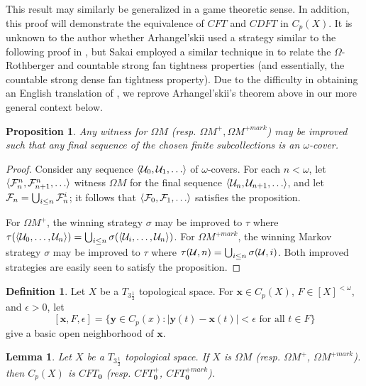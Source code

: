 \documentclass{amsart}
\renewcommand{\vec}{\mathbf}
\theoremstyle{plain}
\newtheorem{lemma}[theorem]{Lemma}
\newtheorem{proposition}[theorem]{Proposition}
\theoremstyle{definition}
\newtheorem{definition}[theorem]{Definition}
\theoremstyle{remark}
\theoremstyle{plain}
\theoremstyle{definition}
\theoremstyle{remark}
\begin{document}
This result may similarly be generalized in a game theoretic sense.
In addition, this proof will demonstrate the equivalence of
\(CFT\) and \(CDFT\) in \(C_p(X)\).
It is unknown to the author whether Arhangel'skii
used a strategy similar to the following proof in \cite{MR837289},
but Sakai employed a similar technique
in \cite{MR964873} to relate the \(\Omega\)-Rothberger and
countable strong fan tightness properties
(and essentially, the countable strong dense fan tightness property).
Due to the difficulty in obtaining an English translation of
\cite{MR837289}, we reprove Arhangel'skii's theorem above in our
more general context below.

\begin{proposition}
  Any witness for \(\Omega M\) (resp.
  \(\Omega M^+,\Omega M^{+mark}\))
  may be improved such that any final sequence of the chosen
  finite subcollections is an \(\omega\)-cover.
\end{proposition}

\begin{proof}
  Consider any sequence \(\<\mc U_0,\mc U_1,\dots\>\) of \(\omega\)-covers.
  For each \(n<\omega\), let
  \(\<\mc F_n^n,\mc F_{n+1}^n,\dots\>\) witness \(\Omega M\) for the final
  sequence \(\<\mc U_n,\mc U_{n+1},\dots\>\),
  and let \(\mathcal{F}_n=\bigcup_{i\leq n}\mathcal{F}_n^i\); it follows that
  \(\<\mc F_0,\mc F_1,\dots\>\) satisfies the proposition.

  For \(\Omega M^+\), the winning strategy \(\sigma\) may be improved to
  \(\tau\) where
  \(
    \tau(\langle\mathcal{U}_0,\dots,\mathcal{U}_n\rangle)
      =
    \bigcup_{i\leq n}\sigma(\langle\mathcal{U}_i,\dots,\mathcal{U}_n\rangle)
  \). For \(\Omega M^{+mark}\), the winning Markov strategy \(\sigma\) may
  be improved to \(\tau\) where
  \(
    \tau(\mathcal{U},n)
      =
    \bigcup_{i\leq n}\sigma(\mathcal{U},i)
  \). Both improved strategies are easily seen to satisfy the proposition.
\end{proof}

\begin{definition}
  Let \(X\) be a \(T_{3\frac{1}{2}}\) topological space.
  For \(\vec x\in C_p(X)\), \(F\in[X]^{<\omega}\), and
  \(\epsilon>0\), let
  \[
    [\vec x,F,\epsilon]
      =
    \{
      \vec y\in C_p(x)
    :
      |\vec y(t)-\vec x(t)|<\epsilon
    \text{ for all }
      t\in F
    \}
  \]
  give a basic open neighborhood of \(\vec x\).
\end{definition}

\begin{lemma}\label{mengerFanLemma1}
  Let \(X\) be a \(T_{3\frac{1}{2}}\) topological space.
  If \(X\) is \(\Omega M\)
  (resp. \(\Omega M^+\), \(\Omega M^{+mark}\)).
  then \(C_p(X)\) is \(CFT_{\vec 0}\)
  (resp. \(CFT_{\vec 0}^+\), \(CFT_{\vec 0}^{+mark}\)).
\end{lemma}
\end{document}
